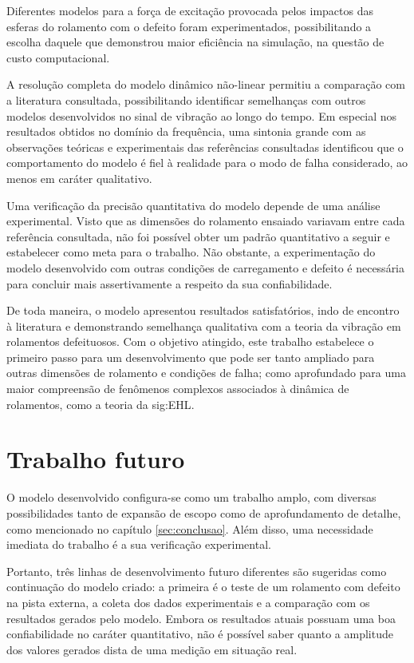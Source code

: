 \documentclass[12pt,oneside,english,brazil,lmodern,siglas,simbolos,cite=num]{ucsmonograph}
\begin{document}
	Diferentes modelos para a força de excitação provocada pelos impactos das esferas do rolamento com o defeito foram experimentados, possibilitando a escolha daquele que demonstrou maior eficiência na simulação, na questão de custo computacional.
	
	A resolução completa do modelo dinâmico não-linear permitiu a comparação com a literatura consultada, possibilitando identificar semelhanças com outros modelos desenvolvidos no sinal de vibração ao longo do tempo.
	Em especial nos resultados obtidos no domínio da frequência, uma sintonia grande com as observações teóricas e experimentais das referências consultadas identificou que o comportamento do modelo é fiel à realidade para o modo de falha considerado, ao menos em caráter qualitativo.
	
	Uma verificação da precisão quantitativa do modelo depende de uma análise experimental.
	Visto que as dimensões do rolamento ensaiado variavam entre cada referência consultada, não foi possível obter um padrão quantitativo a seguir e estabelecer como meta para o trabalho.
	Não obstante, a experimentação do modelo desenvolvido com outras condições de carregamento e defeito é necessária para concluir mais assertivamente a respeito da sua confiabilidade.
	
	De toda maneira, o modelo apresentou resultados satisfatórios, indo de encontro à literatura e demonstrando semelhança qualitativa com a teoria da vibração em rolamentos defeituosos.
	Com o objetivo atingido, este trabalho estabelece o primeiro passo para um desenvolvimento que pode ser tanto ampliado para outras dimensões de rolamento e condições de falha; como aprofundado para uma maior compreensão de fenômenos complexos associados à dinâmica de rolamentos, como a teoria da \gls{sig:EHL}.
	
	\chapter{Trabalho futuro}
	O modelo desenvolvido configura-se como um trabalho amplo, com diversas possibilidades tanto de expansão de escopo como de aprofundamento de detalhe, como mencionado no capítulo \ref{sec:conclusao}.
	Além disso, uma necessidade imediata do trabalho é a sua verificação experimental.
	
	Portanto, três linhas de desenvolvimento futuro diferentes são sugeridas como continuação do modelo criado: a primeira é o teste de um rolamento com defeito na pista externa, a coleta dos dados experimentais e a comparação com os resultados gerados pelo modelo.
	Embora os resultados atuais possuam uma boa confiabilidade no caráter quantitativo, não é possível saber quanto a amplitude dos valores gerados dista de uma medição em situação real.
	
\end{document}
